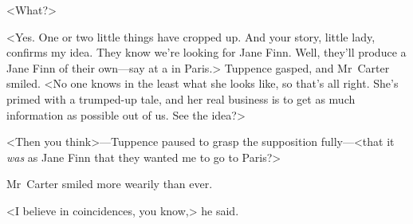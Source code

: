 <What?>

<Yes. One or two little things have cropped up. And your story, little lady, confirms my idea. They know we're looking for Jane Finn. Well, they'll produce a Jane Finn of their own—say at a  in Paris.> Tuppence gasped, and Mr~Carter smiled. <No one knows in the least what she looks like, so that's all right. She's primed with a trumped-up tale, and her real business is to get as much information as possible out of us. See the idea?>

<Then you think>—Tuppence paused to grasp the supposition fully—<that it \emph{was} as Jane Finn that they wanted me to go to Paris?>

Mr~Carter smiled more wearily than ever.

<I believe in coincidences, you know,> he said. 